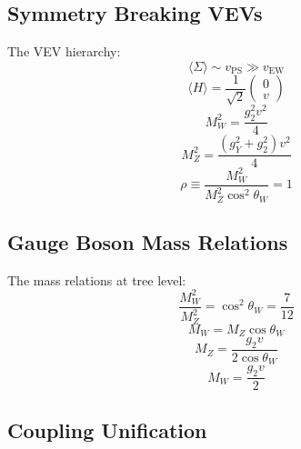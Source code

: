 \documentclass[11pt,a4paper]{article}
\begin{document}
\subsection*{Symmetry Breaking VEVs}
\label{subsec:vev-structure}

The VEV hierarchy:
\begin{equation}
\label{eq:ext-vev-1}
\langle\Sigma\rangle \sim v_{\text{PS}} \gg v_{\text{EW}}
\end{equation}
\begin{equation}
\label{eq:ext-vev-2}
\langle H\rangle = \frac{1}{\sqrt{2}}\begin{pmatrix} 0 \\ v \end{pmatrix}
\end{equation}
\begin{equation}
\label{eq:ext-vev-3}
M_W^2 = \frac{g_2^2 v^2}{4}
\end{equation}
\begin{equation}
\label{eq:ext-vev-4}
M_Z^2 = \frac{(g_Y^2 + g_2^2) v^2}{4}
\end{equation}
\begin{equation}
\label{eq:ext-vev-5}
\rho \equiv \frac{M_W^2}{M_Z^2 \cos^2\theta_W} = 1
\end{equation}

\subsection*{Gauge Boson Mass Relations}
\label{subsec:gauge-mass}

The mass relations at tree level:
\begin{equation}
\label{eq:ext-mass-1}
\frac{M_W^2}{M_Z^2} = \cos^2\theta_W = \frac{7}{12}
\end{equation}
\begin{equation}
\label{eq:ext-mass-2}
M_W = M_Z \cos\theta_W
\end{equation}
\begin{equation}
\label{eq:ext-mass-3}
M_Z = \frac{g_2 v}{2\cos\theta_W}
\end{equation}
\begin{equation}
\label{eq:ext-mass-4}
M_W = \frac{g_2 v}{2}
\end{equation}

\subsection*{Coupling Unification}
\label{subsec:unification}
\end{document}
